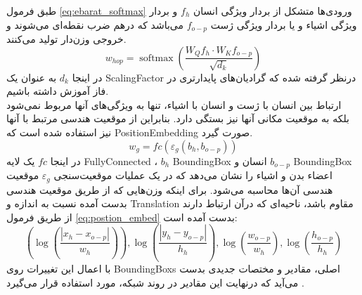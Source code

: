  طبق فرمول %
 \ref{eq:ebarat_softmax}
  ورودی‌ها متشکل از بردار ویژگی انسان %
  $f_h$
   و بردار ویژگی اشیاء و یا بردار ویژگی ژست %
    $f_{o-p}$ 
    می‌باشد که درهم ضرب نقطه‌ای می‌شوند و خروجی وزن‌دار تولید می‌کنند.
 \begin{equation}
 	\label{eq:ebarat_softmax}
 	w_{hop}=\operatorname{softmax}\left(\frac{W_Q f_h \cdot W_K f_{o-p}}{\sqrt{d_k}}\right)
 \end{equation}
 در اینجا %
 $d_k$
 به عنوان یک %
\gls{ScalingFactor}
درنظر گرفته شده که گرادیان‌های پایدارتری در فاز آموزش داشته باشیم. \\
ارتباط بین انسان با ژست و انسان با اشیاء، تنها به ویژگی‌های آنها مربوط نمی‌شود بلکه به موقعیت مکانی آنها نیز بستگی دارد. بنابراین از موقعیت هندسی مرتبط با آنها نیز استفاده شده است که %
\gls{PositionEmbedding}
 صورت گیرد.
\begin{equation}
	\label{eq:scaling_factor}
	w_g=f c\left(\varepsilon_g\left(b_h, b_{o-p}\right)\right)
\end{equation}
 در اینجا %
 $f c$
 یک لایه %
\gls{FullyConnected}
،‌ %
 $b_h$
 \gls{BoundingBox}
  انسان و %
 $b_{o-p}$
 \gls{BoundingBox}
 اعضاء بدن و اشیاء را نشان می‌دهد که در یک عملیات موقعیت‌سنجی   %
 $\varepsilon_g$
 موقعیت هندسی آن‌ها محاسبه می‌شود. برای اینکه وزن‌هایی که از طریق موقعیت هندسی بدست آمده نسبت به اندازه و %
\gls{Translation}
  مقاوم باشد، ناحیه‌ای که درآن ارتباط دارند از طریق فرمول %
  \ref{eq:postion_embed}
   بدست آمده است:
\begin{equation}
	\label{eq:postion_embed}
	\left(\log \left(\frac{\left|x_h-x_{o-p}\right|}{w_h}\right)\right), \log \left(\frac{\left|y_h-y_{o-p}\right|}{h_h}\right), \log \left(\frac{w_{o-p}}{w_h}\right), \log \left(\frac{h_{o-p}}{h_h}\right)
\end{equation}
با اعمال این تغییرات روی 
 \glspl{BoundingBox}
 اصلی، مقادیر و مختصات جدیدی بدست ‌می‌آید که درنهایت این مقادیر در روند شبکه، مورد استفاده قرار می‌گیرد 
\cite{Relation_network_object}
.
 

